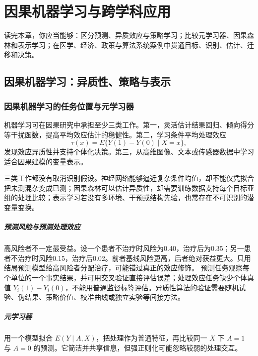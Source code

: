 \chapter{因果机器学习与跨学科应用}
\label{ch:causal-ml-applications}

\begin{learninggoals}
读完本章，你应当能够：区分预测、异质效应与策略学习；比较元学习器、因果森林和表示学习；在医学、经济、政策与算法系统案例中贯通目标、识别、估计、迁移和决策。
\end{learninggoals}

\section{因果机器学习：异质性、策略与表示}

\subsection{因果机器学习的任务位置与元学习器}

机器学习可在因果研究中承担至少三类工作。第一，灵活估计结果回归、倾向得分等干扰函数，提高平均效应估计的稳健性。第二，学习条件平均处理效应
\[
\tau(x)=E\{Y(1)-Y(0)\mid X=x\},
\]
发现效应异质性并支持个体化决策。第三，从高维图像、文本或传感器数据中学习适合因果建模的变量表示。

三类工作都没有取消识别假设。神经网络能够逼近复杂条件均值，却不能仅凭拟合把未测混杂变成已测；因果森林可以估计异质性，却需要训练数据支持每个目标亚组的处理比较；表示学习若没有多环境、干预或结构先验，也常存在不可识别的潜变量变换。

\paragraph{预测风险与预测处理效应}

高风险者不一定最受益。设一个患者不治疗时风险为0.40，治疗后为0.35；另一患者不治疗时风险0.15，治疗后0.02。前者基线风险更高，后者绝对获益更大。只用结局预测模型给高风险者分配治疗，可能错过真正的效应修饰。
预测任务观察每个单位的一个事实结果，并可用交叉验证直接评估误差；处理效应任务缺少个体真值 $Y_i(1)-Y_i(0)$，不能用普通监督标签评估。异质性算法的验证需要随机试验、伪结果、策略价值、校准曲线或独立实验等间接方法。

\paragraph{元学习器}

用一个模型拟合 $E(Y\mid A,X)$，把处理作为普通特征，再比较同一 $X$ 下 $A=1$ 与 $A=0$ 的预测。它简洁并共享信息，但强正则化可能忽略较弱的处理交互。

